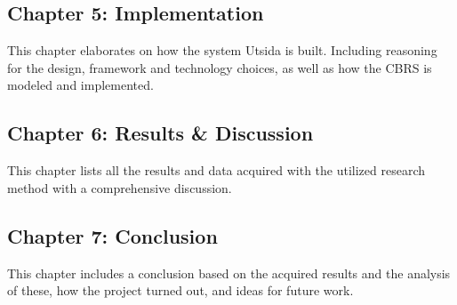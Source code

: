 \subsection*{Chapter 5: Implementation}
This chapter elaborates on how the system Utsida is built. Including reasoning for the design, framework and technology choices, as well as how the CBRS is modeled and implemented.

\subsection*{Chapter 6: Results \& Discussion}
This chapter lists all the results and data acquired with the utilized research method with a comprehensive discussion.

\subsection*{Chapter 7: Conclusion}
This chapter includes a conclusion based on the acquired results and the analysis of these, how the project turned out, and ideas for future work.

\cleardoublepage